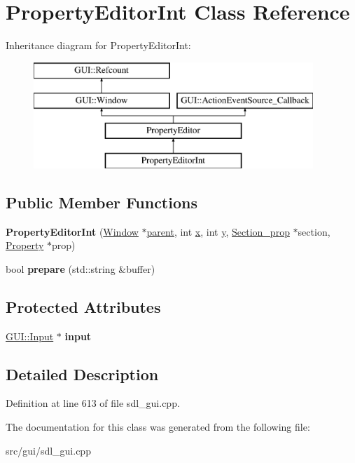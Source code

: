 \hypertarget{classPropertyEditorInt}{\section{Property\-Editor\-Int Class Reference}
\label{classPropertyEditorInt}
}
Inheritance diagram for Property\-Editor\-Int\-:\begin{figure}[H]
\begin{center}
\leavevmode
\includegraphics[height=4.000000cm]{classPropertyEditorInt}
\end{center}
\end{figure}
\subsection*{Public Member Functions}
\begin{DoxyCompactItemize}
\item 
\hypertarget{classPropertyEditorInt_a0f41557774e65f1aa6a57313f3ebf824}{{\bfseries Property\-Editor\-Int} (\hyperlink{classGUI_1_1Window_ae828e9daa964dfc65a3550fb03117d30}{Window} $\ast$\hyperlink{classGUI_1_1Window_a2e593ff65e7702178d82fe9010a0b539}{parent}, int \hyperlink{classGUI_1_1Window_a6ca6a80ca00c9e1d8ceea8d3d99a657d}{x}, int \hyperlink{classGUI_1_1Window_a0ee8e923aff2c3661fc2e17656d37adf}{y}, \hyperlink{classSection__prop}{Section\-\_\-prop} $\ast$section, \hyperlink{classProperty}{Property} $\ast$prop)}\label{classPropertyEditorInt_a0f41557774e65f1aa6a57313f3ebf824}

\item 
\hypertarget{classPropertyEditorInt_a5905c05b04394d9c0f9ee1c332df339e}{bool {\bfseries prepare} (std\-::string \&buffer)}\label{classPropertyEditorInt_a5905c05b04394d9c0f9ee1c332df339e}

\end{DoxyCompactItemize}
\subsection*{Protected Attributes}
\begin{DoxyCompactItemize}
\item 
\hypertarget{classPropertyEditorInt_a9723b1ce18a08a85bbef9edec6b9fa06}{\hyperlink{classGUI_1_1Input}{G\-U\-I\-::\-Input} $\ast$ {\bfseries input}}\label{classPropertyEditorInt_a9723b1ce18a08a85bbef9edec6b9fa06}

\end{DoxyCompactItemize}


\subsection{Detailed Description}


Definition at line 613 of file sdl\-\_\-gui.\-cpp.



The documentation for this class was generated from the following file\-:\begin{DoxyCompactItemize}
\item 
src/gui/sdl\-\_\-gui.\-cpp\end{DoxyCompactItemize}
